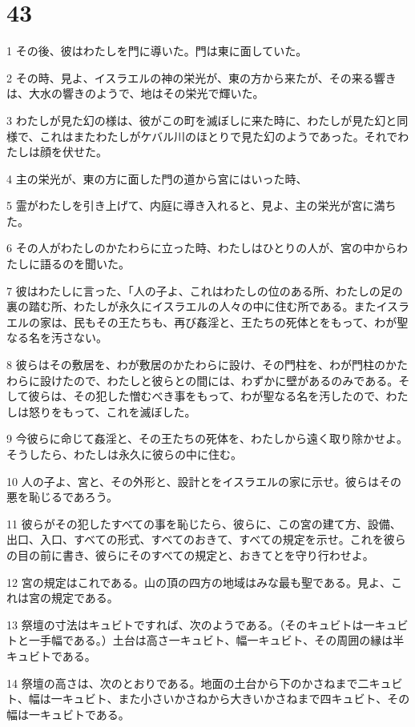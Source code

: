 \chapter{43}

\par 1 その後、彼はわたしを門に導いた。門は東に面していた。
\par 2 その時、見よ、イスラエルの神の栄光が、東の方から来たが、その来る響きは、大水の響きのようで、地はその栄光で輝いた。
\par 3 わたしが見た幻の様は、彼がこの町を滅ぼしに来た時に、わたしが見た幻と同様で、これはまたわたしがケバル川のほとりで見た幻のようであった。それでわたしは顔を伏せた。
\par 4 主の栄光が、東の方に面した門の道から宮にはいった時、
\par 5 霊がわたしを引き上げて、内庭に導き入れると、見よ、主の栄光が宮に満ちた。
\par 6 その人がわたしのかたわらに立った時、わたしはひとりの人が、宮の中からわたしに語るのを聞いた。
\par 7 彼はわたしに言った、「人の子よ、これはわたしの位のある所、わたしの足の裏の踏む所、わたしが永久にイスラエルの人々の中に住む所である。またイスラエルの家は、民もその王たちも、再び姦淫と、王たちの死体とをもって、わが聖なる名を汚さない。
\par 8 彼らはその敷居を、わが敷居のかたわらに設け、その門柱を、わが門柱のかたわらに設けたので、わたしと彼らとの間には、わずかに壁があるのみである。そして彼らは、その犯した憎むべき事をもって、わが聖なる名を汚したので、わたしは怒りをもって、これを滅ぼした。
\par 9 今彼らに命じて姦淫と、その王たちの死体を、わたしから遠く取り除かせよ。そうしたら、わたしは永久に彼らの中に住む。
\par 10 人の子よ、宮と、その外形と、設計とをイスラエルの家に示せ。彼らはその悪を恥じるであろう。
\par 11 彼らがその犯したすべての事を恥じたら、彼らに、この宮の建て方、設備、出口、入口、すべての形式、すべてのおきて、すべての規定を示せ。これを彼らの目の前に書き、彼らにそのすべての規定と、おきてとを守り行わせよ。
\par 12 宮の規定はこれである。山の頂の四方の地域はみな最も聖である。見よ、これは宮の規定である。
\par 13 祭壇の寸法はキュビトですれば、次のようである。（そのキュビトは一キュビトと一手幅である。）土台は高さ一キュビト、幅一キュビト、その周囲の縁は半キュビトである。
\par 14 祭壇の高さは、次のとおりである。地面の土台から下のかさねまで二キュビト、幅は一キュビト、また小さいかさねから大きいかさねまで四キュビト、その幅は一キュビトである。
